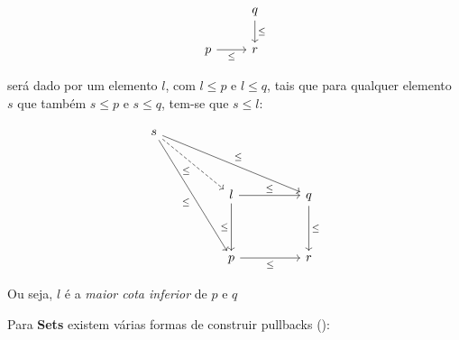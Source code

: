 \documentclass[../main.tex]{subfiles}
\begin{document}
\[\begin{tikzcd}
	& q \\
	p & r
	\arrow["\leq", from=1-2, to=2-2]
	\arrow["\leq"', from=2-1, to=2-2]
\end{tikzcd}\]

será dado por um elemento $l$, com $l \leq p$ e $l \leq q$, tais que para qualquer elemento $s$ que também $s \leq p$ e $s \leq q$, tem-se que $s \leq l$:

\[\begin{tikzcd}
	s \\
	\\
	&& l && q \\
	\\
	&& p && r
	\arrow["\leq"', dashed, from=1-1, to=3-3]
	\arrow["\leq", from=1-1, to=3-5]
	\arrow["\leq"', from=1-1, to=5-3]
	\arrow["\leq", from=3-3, to=3-5]
	\arrow["\leq"', from=3-3, to=5-3]
	\arrow["\leq", from=3-5, to=5-5]
	\arrow["\leq"', from=5-3, to=5-5]
\end{tikzcd}\]

Ou seja, $l$ é a \emph{maior cota inferior} de $p$ e $q$

Para \textbf{Sets} existem várias formas de construir pullbacks (\cite{rosiak2022}):
\end{document}

